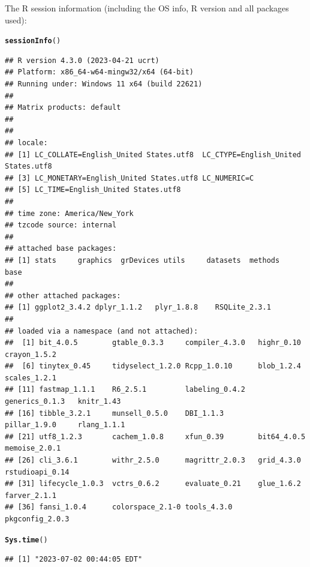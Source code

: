 \documentclass{article}\usepackage[]{graphicx}\usepackage[]{xcolor}
\makeatletter
\newcommand{\hlstd}[1]{\textcolor[rgb]{0.345,0.345,0.345}{#1}}%
\newcommand{\hlkwd}[1]{\textcolor[rgb]{0.737,0.353,0.396}{\textbf{#1}}}%
\newenvironment{kframe}{%
 \def\at@end@of@kframe{}%
 \ifinner\ifhmode%
  \def\at@end@of@kframe{\end{minipage}}%
  \begin{minipage}{\columnwidth}%
 \fi\fi%
 \def\FrameCommand##1{\hskip\@totalleftmargin \hskip-\fboxsep
 \colorbox{shadecolor}{##1}\hskip-\fboxsep
     \hskip-\linewidth \hskip-\@totalleftmargin \hskip\columnwidth}%
 \MakeFramed {\advance\hsize-\width
   \@totalleftmargin\z@ \linewidth\hsize
   \@setminipage}}%
 {\par\unskip\endMakeFramed%
 \at@end@of@kframe}
\newenvironment{knitrout}{}{} %
\makeatother
\begin{document}
The R session information (including the OS info, R version and all
packages used):

\begin{knitrout}
\color{fgcolor}\begin{kframe}
\begin{alltt}
\hlkwd{sessionInfo}\hlstd{()}
\end{alltt}
\begin{verbatim}
## R version 4.3.0 (2023-04-21 ucrt)
## Platform: x86_64-w64-mingw32/x64 (64-bit)
## Running under: Windows 11 x64 (build 22621)
## 
## Matrix products: default
## 
## 
## locale:
## [1] LC_COLLATE=English_United States.utf8  LC_CTYPE=English_United States.utf8   
## [3] LC_MONETARY=English_United States.utf8 LC_NUMERIC=C                          
## [5] LC_TIME=English_United States.utf8    
## 
## time zone: America/New_York
## tzcode source: internal
## 
## attached base packages:
## [1] stats     graphics  grDevices utils     datasets  methods   base     
## 
## other attached packages:
## [1] ggplot2_3.4.2 dplyr_1.1.2   plyr_1.8.8    RSQLite_2.3.1
## 
## loaded via a namespace (and not attached):
##  [1] bit_4.0.5        gtable_0.3.3     compiler_4.3.0   highr_0.10       crayon_1.5.2    
##  [6] tinytex_0.45     tidyselect_1.2.0 Rcpp_1.0.10      blob_1.2.4       scales_1.2.1    
## [11] fastmap_1.1.1    R6_2.5.1         labeling_0.4.2   generics_0.1.3   knitr_1.43      
## [16] tibble_3.2.1     munsell_0.5.0    DBI_1.1.3        pillar_1.9.0     rlang_1.1.1     
## [21] utf8_1.2.3       cachem_1.0.8     xfun_0.39        bit64_4.0.5      memoise_2.0.1   
## [26] cli_3.6.1        withr_2.5.0      magrittr_2.0.3   grid_4.3.0       rstudioapi_0.14 
## [31] lifecycle_1.0.3  vctrs_0.6.2      evaluate_0.21    glue_1.6.2       farver_2.1.1    
## [36] fansi_1.0.4      colorspace_2.1-0 tools_4.3.0      pkgconfig_2.0.3
\end{verbatim}
\begin{alltt}
\hlkwd{Sys.time}\hlstd{()}
\end{alltt}
\begin{verbatim}
## [1] "2023-07-02 00:44:05 EDT"
\end{verbatim}
\end{kframe}
\end{knitrout}
\end{document}

